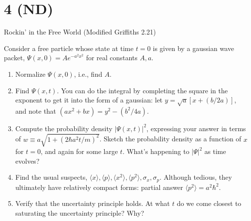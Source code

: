 \documentclass{article}
\begin{document}
\newpage

\section*{4 (ND)}
\begin{ques}\label{q4}
Rockin’ in the Free World (Modified Griffiths 2.21)

Consider a free particle whose state at time $t = 0$ is given by a gaussian wave packet, $\Psi(x, 0) = A e^{-a^2 x^2}$ for real constants $A, a$.

\begin{enumerate}
\item Normalize $\Psi(x, 0)$, i.e., find $A$.  
\item Find $\Psi(x, t)$. You can do the integral by completing the square in the exponent to get it into the form of a gaussian: let $y = \sqrt{a}[x + (b/2a)]$, and note that $(a x^2 + b x) = y^2 - (b^2 / 4a)$.  
\item Compute the probability density $|\Psi(x, t)|^2$, expressing your answer in terms of $w \equiv a \sqrt{1 + (2\hbar a^2 t / m)^2}$. Sketch the probability density as a function of $x$ for $t = 0$, and again for some large $t$. What’s happening to $|\Psi|^2$ as time evolves?  
\item Find the usual suspects, $\langle x \rangle, \langle p \rangle, \langle x^2 \rangle, \langle p^2 \rangle, \sigma_x, \sigma_p$. Although tedious, they ultimately have relatively compact forms: partial answer $\langle p^2 \rangle = a^2 \hbar^2$.  
\item Verify that the uncertainty principle holds. At what $t$ do we come closest to saturating the uncertainty principle? Why?
\end{enumerate}
\end{ques}
\end{document}
